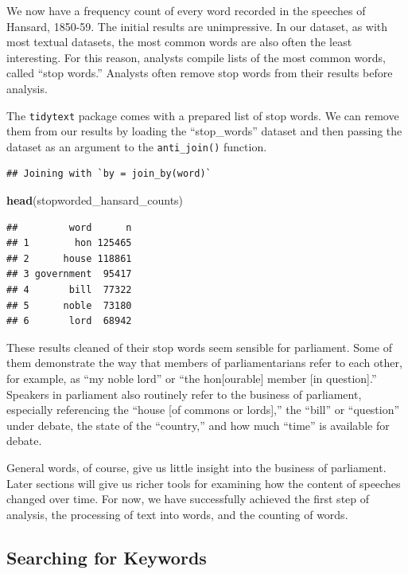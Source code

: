 \documentclass[
]{article}
\newenvironment{Shaded}{\begin{snugshade}}{\end{snugshade}}
\newcommand{\FunctionTok}[1]{\textcolor[rgb]{0.13,0.29,0.53}{\textbf{#1}}}
\newcommand{\NormalTok}[1]{#1}
\begin{document}
We now have a frequency count of every word recorded in the speeches of
Hansard, 1850-59. The initial results are unimpressive. In our dataset,
as with most textual datasets, the most common words are also often the
least interesting. For this reason, analysts compile lists of the most
common words, called ``stop words.'' Analysts often remove stop words
from their results before analysis.

The \texttt{tidytext} package comes with a prepared list of stop words.
We can remove them from our results by loading the ``stop\_words''
dataset and then passing the dataset as an argument to the
\texttt{anti\_join()} function.

\begin{verbatim}
## Joining with `by = join_by(word)`
\end{verbatim}

\begin{Shaded}
\begin{Highlighting}[]
\FunctionTok{head}\NormalTok{(stopworded\_hansard\_counts)}
\end{Highlighting}
\end{Shaded}

\begin{verbatim}
##         word      n
## 1        hon 125465
## 2      house 118861
## 3 government  95417
## 4       bill  77322
## 5      noble  73180
## 6       lord  68942
\end{verbatim}

These results cleaned of their stop words seem sensible for parliament.
Some of them demonstrate the way that members of parliamentarians refer
to each other, for example, as ``my noble lord'' or ``the
hon{[}ourable{]} member {[}in question{]}.'' Speakers in parliament also
routinely refer to the business of parliament, especially referencing
the ``house {[}of commons or lords{]},'' the ``bill'' or ``question''
under debate, the state of the ``country,'' and how much ``time'' is
available for debate.

General words, of course, give us little insight into the business of
parliament. Later sections will give us richer tools for examining how
the content of speeches changed over time. For now, we have successfully
achieved the first step of analysis, the processing of text into words,
and the counting of words.

\subsection{Searching for Keywords}\label{searching-for-keywords}
\end{document}
